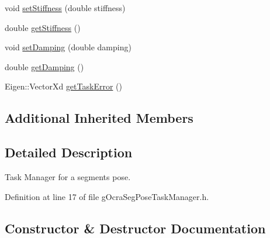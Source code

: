 \begin{DoxyCompactItemize}
void \hyperlink{classgocra_1_1gOcraSegPoseTaskManager_aee63dd2df0da89a98c844245abd87297}{set\+Stiffness} (double stiffness)
\item 
double \hyperlink{classgocra_1_1gOcraSegPoseTaskManager_a1fabad2f6aef0f4e3088225ba71555a5}{get\+Stiffness} ()
\item 
void \hyperlink{classgocra_1_1gOcraSegPoseTaskManager_af1c9cd4b30f956ef607c19a7756c71f9}{set\+Damping} (double damping)
\item 
double \hyperlink{classgocra_1_1gOcraSegPoseTaskManager_af8a42a3b2f546377095c6c7a5849ef58}{get\+Damping} ()
\item 
Eigen\+::\+Vector\+Xd \hyperlink{classgocra_1_1gOcraSegPoseTaskManager_a059b69af0a960110bb14863f0179b1cd}{get\+Task\+Error} ()
\end{DoxyCompactItemize}
\subsection*{Additional Inherited Members}


\subsection{Detailed Description}
Task Manager for a segment\textquotesingle{}s pose. 



Definition at line 17 of file g\+Ocra\+Seg\+Pose\+Task\+Manager.\+h.



\subsection{Constructor \& Destructor Documentation}

